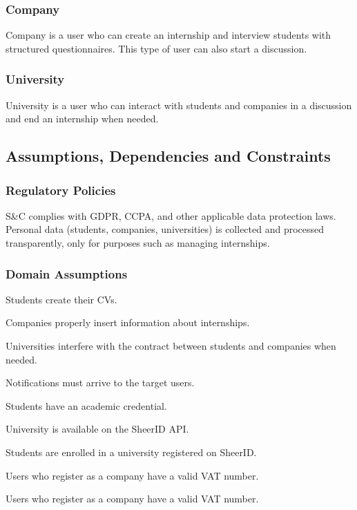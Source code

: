 \subsubsection{Company}
Company is a user who can create an internship and interview students with structured questionnaires. This type of user can also start a discussion.
\subsubsection{University}
University is a user who can interact with students and companies in a discussion and end an internship when needed.
\subsection{Assumptions, Dependencies and Constraints}
\subsubsection{Regulatory Policies}
S\&C complies with GDPR, CCPA, and other applicable data protection laws.
Personal data (students, companies, universities) is collected and processed transparently, only for purposes such as managing internships.
\subsubsection{Domain Assumptions}
\begin{domain-assumptions}
    \item Students create their CVs.
    \item Companies properly insert information about internships.
    \item Universities interfere with the contract between students and companies when needed.
    \item Notifications must arrive to the target users.
    \item Students have an academic credential.
    \item University is available on the SheerID API.
    \item Students are enrolled in a university registered on SheerID.
    \item Users who register as a company have a valid VAT number.
    \item Users who register as a company have a valid VAT number.
\end{domain-assumptions}